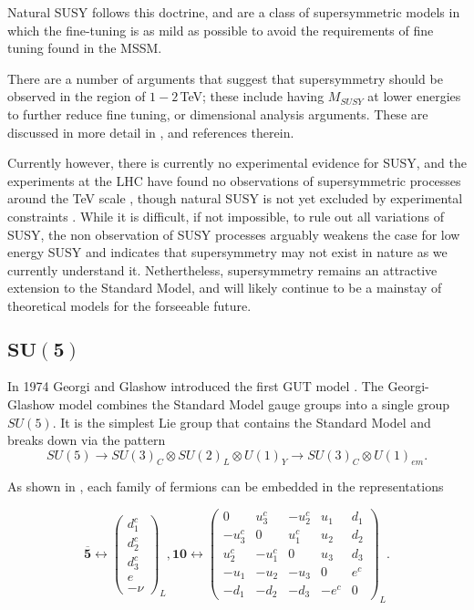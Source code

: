 \documentclass{article}
\begin{document}
Natural SUSY follows this doctrine, and are a class of supersymmetric models in which the fine-tuning is as mild as possible \cite{NaturalSUSY} to avoid the requirements of fine tuning found in the MSSM.

There are a number of arguments that suggest that supersymmetry should be observed in the region of $1-2\,$TeV; these include having $M_{SUSY}$ at lower energies to further reduce fine tuning, or dimensional analysis arguments. These are discussed in more detail in \cite{SUSYTEV1},\cite{SUSYPrimer} and references therein.

Currently however, there is currently no experimental evidence for SUSY, and the experiments at the LHC have found no observations of supersymmetric processes around the TeV scale \cite{SUSYSearch1}, though natural SUSY is not yet excluded by experimental constraints \cite{NaturalSUSYConstraints}. While it is difficult, if not impossible, to rule out all variations of SUSY, the non observation of SUSY processes arguably weakens the case for low energy SUSY and indicates that supersymmetry may not exist in nature as we currently understand it. Nethertheless, supersymmetry remains an attractive extension to the Standard Model, and will likely continue to be a mainstay of theoretical models for the forseeable future.

\subsection{$\bm{SU(5)}$}%
\label{sec:GUT_SU5}
In 1974 Georgi and Glashow introduced the first GUT model \cite{SU5GeorgiGlashow}.
The Georgi-Glashow model combines the Standard Model gauge groups into a single group $SU(5)$. It is the simplest Lie group that contains the Standard Model and breaks down via the pattern
\begin{equation}
SU(5)\rightarrow SU(3)_C \otimes SU(2)_L \otimes U(1)_Y \rightarrow SU(3)_C \otimes U(1)_{em}.
\end{equation}

As shown in \cite{GUTPHD}, each family of fermions can be embedded in the representations 

\begin{equation}
\overline{\bm{5}} \leftrightarrow\left(
\begin{matrix}
    d_{1}^{c} \\
    d_{2}^{c} \\
    d_{3}^{c} \\
    e\\
    -\nu
\end{matrix}\right)_L,
\bm{10}\leftrightarrow\left(
\begin{matrix}
0 & u_{3}^{c} & -u_{2}^{c} & u_{1} & d_{1} \\
-u_{3}^{c} & 0 & u_{1}^{c} & u_{2} & d_{2} \\
u_{2}^{c} & -u_{1}^{c} & 0 & u_{3} & d_{3} \\
-u_1 & -u_2 & -u_3 & 0    & e^c    \\
-d_1 & -d_2 & -d_3 & -e^c & 0
\end{matrix}\right)_L.
\end{equation}
\end{document}
